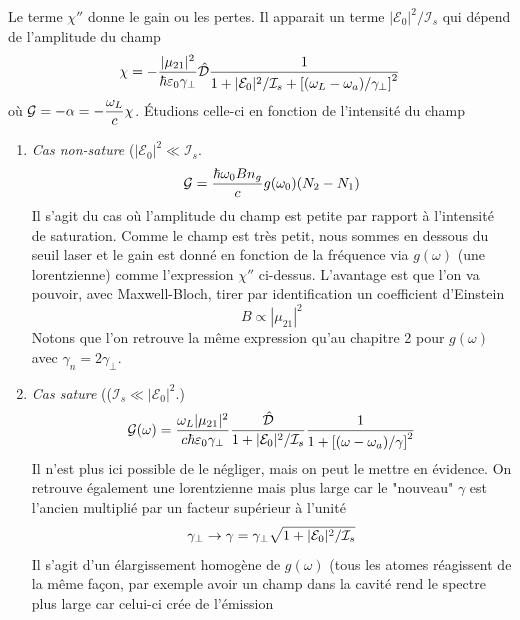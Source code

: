 Le terme $\chi''$ donne le gain ou les pertes. Il apparait un terme $|\mathcal{E}_0|^2/\mathcal{I}_s$ 
qui dépend de l'amplitude du champ
\begin{equation}
\chi  =  - \frac{{|{\mu _{21}}{|^2}}}{{\hbar {\varepsilon _0}{\gamma _ \bot }}}\hat {\cal D}\frac{1}{{1 + |{{\cal E}_0}{|^2}/{{{\cal I}}_s} + {{[({\omega _L} - {\omega _a})/{\gamma _ \bot }]}^2}}}
\end{equation}
où $\displaystyle {{\cal G}} =  - \alpha  =  - \frac{{{\omega _L}}}{c}\chi $. Étudions celle-ci en fonction de l'intensité du champ
\begin{enumerate}
\item \textit{Cas non-sature} ($|\mathcal{E}_0|^2\ll \mathcal{I}_s$.
\begin{equation}
{\cal G} = \frac{{\hbar {\omega _0}B{n_g}}}{c}g({\omega _0})({N_2} - {N_1})
\end{equation}
Il s'agit du cas où l'amplitude du champ est petite par rapport à l'intensité de saturation. Comme le
champ est très petit, nous sommes en dessous du seuil laser et le gain est donné en fonction de la 
fréquence via $g(\omega)$ (une lorentzienne) comme l'expression $\chi''$ ci-dessus. L'avantage est 
que l'on va pouvoir, avec Maxwell-Bloch, tirer par identification un coefficient d'Einstein
\begin{equation}
B \propto |\mu_{21}|^2
\end{equation}
Notons que l'on retrouve la même expression qu'au chapitre 2 pour $g(\omega)$ avec $\gamma_n =
2\gamma_\perp$.
\item \textit{Cas sature} (($\mathcal{I}_s\ll|\mathcal{E}_0|^2 $.)
\begin{equation}
{{\cal G}}(\omega ) = \frac{{{\omega _L}|{\mu _{21}}{|^2}}}{{c\hbar {\varepsilon _0}{\gamma _ \bot }}}\frac{{\hat {\cal D}}}{{1 + |{{\cal E}_0}{|^2}/{{{\cal I}}_s}}}\frac{1}{{1 + {{[(\omega  - {\omega _a})/\gamma ]}^2}}}
\end{equation}
Il n'est plus ici possible de le négliger, mais on peut le mettre en évidence. On retrouve également 
une lorentzienne mais plus large car le "nouveau" $\gamma$ est l'ancien multiplié par un facteur 
supérieur à l'unité
\begin{equation}
{\gamma _ \bot } \to {\rm{ }}\gamma  = {\gamma _ \bot }\sqrt {1 + |{{\cal E}_0}{|^2}/{{{\cal I}}_s}} 
\end{equation}
Il s'agit d'un élargissement homogène de $g(\omega)$ (tous les atomes réagissent de la même façon, 
par exemple avoir un champ dans la cavité rend le spectre plus large car celui-ci crée de l'émission 

\end{enumerate}
